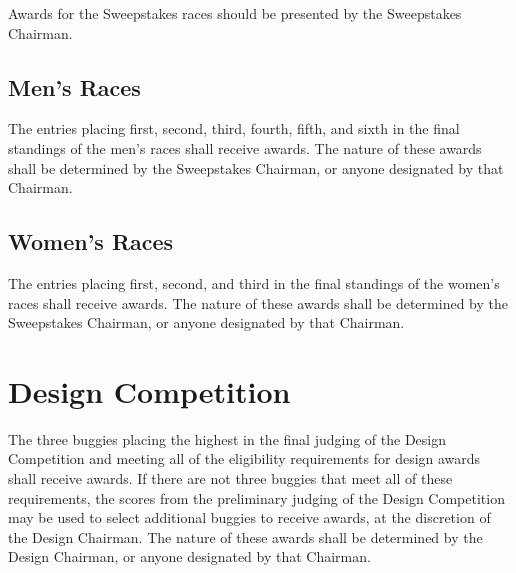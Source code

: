 \documentclass[openany]{book}
\begin{document}
Awards for the Sweepstakes races should be presented by the Sweepstakes Chairman.

\subsection{Men's Races}

The entries placing first, second, third, fourth, fifth, and sixth in the final standings of the men's races shall receive awards. The nature of these awards shall be determined by the Sweepstakes Chairman, or anyone designated by that Chairman.

\subsection{Women's Races}

The entries placing first, second, and third in the final standings of the women's races shall receive awards. The nature of these awards shall be determined by the Sweepstakes Chairman, or anyone designated by that Chairman.

\section{Design Competition}

The three buggies placing the highest in the final judging of the Design Competition and meeting all of the eligibility requirements for design awards shall receive awards. If there are not three buggies that meet all of these requirements, the scores from the preliminary judging of the Design Competition may be used to select additional buggies to receive awards, at the discretion of the Design Chairman. The nature of these awards shall be determined by the Design Chairman, or anyone designated by that Chairman.
\end{document}
